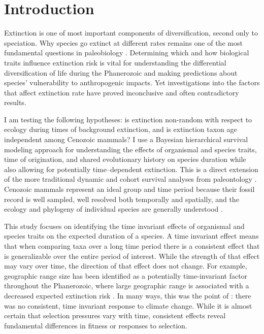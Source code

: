\documentclass[12pt,letterpaper]{article}
\begin{document}
\section{Introduction}

Extinction is one of most important components of diversification, second only to speciation. Why species go extinct at different rates remains one of the most fundamental questions in paleobiology \citep{Simpson1944,VanValen1973,Raup1991b,Raup1994,Quental2013,Wagner2014b,Jablonski2005,Payne2007,Kitchell1986}. Determining which and how biological traits influence extinction risk is vital for understanding the differential diversification of life during the Phanerozoic and making predictions about species' vulnerability to anthropogenic impacts. Yet investigations into the factors that affect extinction rate have proved inconclusive and often contradictory results. 

I am testing the following hypotheses: is extinction non-random with respect to ecology during times of background extinction, and is extinction taxon age independent among Cenozoic mammals? I use a Bayesian hierarchical survival modeling approach for understanding the effects of organismal and species traits, time of origination, and shared evolutionary history on species duration while also allowing for potentially time--dependent extinction. This is a direct extension of the more traditional dynamic and cohort survival analyses from paleontology \citep{Simpson1944,VanValen1973,Foote1988,Raup1978,Raup1975,VanValen1979,Baumiller1993,Sepkoski1975}. Cenozoic mammals represent an ideal group and time period because their fossil record is well sampled, well resolved both temporally and spatially, and the ecology and phylogeny of individual species are generally understood \citep{Alroy2009,Alroy2000g,Jernvall2002,Liow2008,Smith2004,Quental2013,Alroy1996a,Alroy1998,Simpson1944,Blois2009,Tomiya2013,Marcot2014}. 

This study focuses on identifying the time invariant effects of organismal and species traits on the expected duration of a species. A time invariant effect means that when comparing taxa over a long time period there is a consistent effect that is generalizable over the entire period of interest. While the strength of that effect may vary over time, the direction of that effect does not change. For example, geographic range size has been identified as a potentially time-invariant factor throughout the Phanerozoic, where large geographic range is associated with a decreased expected extinction risk \citep{Payne2007}.  In many ways, this was the point of \citet{Alroy2000g}: there was no consistent, time invariant response to climate change. While it is almost certain that selection pressures vary with time, consistent effects reveal fundamental differences in fitness or responses to selection. %
\end{document}

